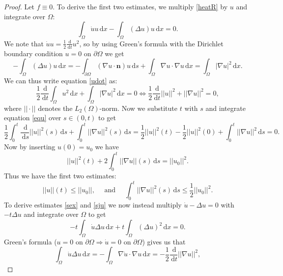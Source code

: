 \documentclass[12pt, a4paper]{article}
\newcommand{\rd}{\ensuremath{\mathrm{d}}}
\newcommand{\id}{\ensuremath{\,\rd}}
\numberwithin{equation}{section}
\begin{document}
\begin{proof}
Let $f\equiv 0$. To derive the first two estimates, we multiply \eqref{heatR} by $u$ and integrate over $\Omega$:
\begin{equation}
\label{udot}
\int_\Omega \dot{u}u\id x - \int_\Omega (\Delta u)u\id x = 0.
\end{equation}
We note that $\dot{u}u = \frac{1}{2}\frac{\id}{\id t} u^2$, so by using Green's formula with the Dirichlet boundary condition $u=0$ on $\partial\Omega$ we get
\begin{equation*}
-\int_\Omega (\Delta u) u \id x = -\int_{\partial\Omega} (\nabla u \cdot \mathbf{n}) u \id s + \int_\Omega \nabla u \cdot \nabla u \id x = \int_\Omega |\nabla u|^2\id x.
\end{equation*}
We can thus write equation \eqref{udot} as:
\begin{equation}
\label{equ}
\frac{1}{2}\frac{\id}{\id t}\int_\Omega u^2 \id x + \int_\Omega |\nabla u|^2 \id x = 0 \Leftrightarrow \frac{1}{2}\frac{\id}{\id t}||u||^2 + ||\nabla u ||^2 = 0,
\end{equation}
where $||\cdot||$ denotes the $L_2(\Omega)$-norm. Now we substitute $t$ with $s$ and integrate equation \eqref{equ} over $s\in(0,t)$ to get
\begin{equation*}
\frac{1}{2}\int_0^t \frac{\id}{\id s}||u||^2(s)\id s + \int_0^t||\nabla u||^2(s)\id s = \frac{1}{2}||u||^2(t)-\frac{1}{2}||u||^2(0)+\int_0^t||\nabla u||^2\id s = 0.
\end{equation*}
Now by inserting $u(0)=u_0$ we have
\begin{equation*}
||u||^2(t)+2\int_0^t||\nabla u||(s) \id s = ||u_0||^2.
\end{equation*}
Thus we have the first two estimates:
\begin{equation*}
||u||(t)\leq ||u_0||, \quad \text{ and } \quad \int_0^t ||\nabla u||^2(s) \id s \leq \frac{1}{2}||u_0||^2.
\end{equation*}
To derive estimates \eqref{sex} and \eqref{sju} we now instead multiply $\dot{u}-\Delta u = 0$ with $-t\Delta u$ and integrate over $\Omega$ to get
\begin{equation}
\label{ton}
-t\int_\Omega \dot{u}\Delta u \id x + t \int_\Omega (\Delta u)^2 \id x = 0.
\end{equation}
Green's formula ($u=0$ on $\partial\Omega \Rightarrow \dot{u} = 0$ on $\partial\Omega$) gives us that
\begin{equation*}
\int_\Omega \dot{u}\Delta u \id x = - \int_\Omega \nabla \dot{u} \cdot \nabla u \id x = - \frac{1}{2}\frac{\id}{\id t}||\nabla u||^2,

\end{equation*}
\end{proof}
\end{document}
